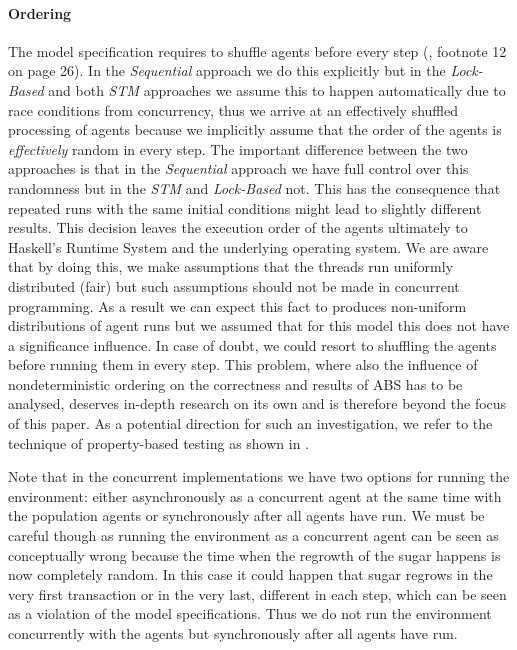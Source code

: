 \paragraph{Ordering} The model specification requires to shuffle agents before every step (\cite{epstein_growing_1996}, footnote 12 on page 26). In the \textit{Sequential} approach we do this explicitly but in the \textit{Lock-Based} and both \textit{STM} approaches we assume this to happen automatically due to race conditions from concurrency, thus we arrive at an effectively shuffled processing of agents because we implicitly assume that the order of the agents is \textit{effectively} random in every step. The important difference between the two approaches is that in the \textit{Sequential} approach we have full control over this randomness but in the \textit{STM} and \textit{Lock-Based} not. This has the consequence that repeated runs with the same initial conditions might lead to slightly different results. 
This decision leaves the execution order of the agents ultimately to Haskell's Runtime System and the underlying operating system. We are aware that by doing this, we make assumptions that the threads run uniformly distributed (fair) but such assumptions should not be made in concurrent programming. As a result we can expect this fact to produces non-uniform distributions of agent runs but we assumed that for this model this does not have a significance influence. In case of doubt, we could resort to shuffling the agents before running them in every step. This problem, where also the influence of nondeterministic ordering on the correctness and results of ABS has to be analysed, deserves in-depth research on its own and is therefore beyond the focus of this paper. As a potential direction for such an investigation, we refer to the technique of property-based testing as shown in \cite{thaler_show_2019}.

Note that in the concurrent implementations we have two options for running the environment: either asynchronously as a concurrent agent at the same time with the population agents or synchronously after all agents have run. We must be careful though as running the environment as a concurrent agent can be seen as conceptually wrong because the time when the regrowth of the sugar happens is now completely random. In this case it could happen that sugar regrows in the very first transaction or in the very last, different in each step, which can be seen as a violation of the model specifications. Thus we do not run the environment concurrently with the agents but synchronously after all agents have run.


